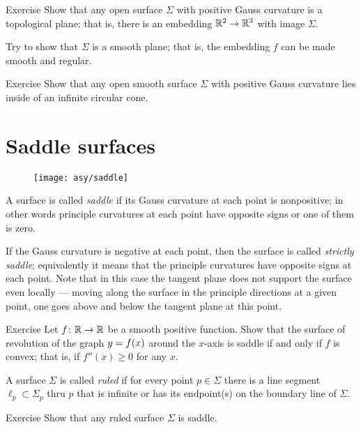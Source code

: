 \begin{thm}{Exercise}
Show that any open surface $\Sigma$ with positive Gauss curvature is a topological plane;
that is, there is an embedding $\mathbb{R}^2\to\mathbb{R}^3$ with image $\Sigma$.

Try to show that $\Sigma$ is a smooth plane; that is, the embedding $f$ can be made smooth and regular.
\end{thm}

\begin{thm}{Exercise}\label{ex:circular-cone}
Show that any open smooth surface $\Sigma$ with positive Gauss curvature
lies inside of an infinite circular cone. 
\end{thm} 


\section*{Saddle surfaces}

\begin{wrapfigure}{r}{43 mm}
\vskip-8mm
\centering
\texttt{[image: asy/saddle]}
\vskip0mm
\end{wrapfigure}

A surface is called \emph{saddle} if its Gauss curvature at each point is nonpositive;
in other words principle curvatures at each point have opposite signs or one of them is zero.

If the Gauss curvature is negative at each point,
then the surface is called \emph{strictly saddle};
equivalently it means that the principle curvatures have opposite signs at each point.
Note that in this case the tangent plane does not support the surface even locally --- moving along the surface in the principle directions at a given point, one goes above and below the tangent plane at this point.  


\begin{thm}{Exercise}\label{ex:convex-revolution}
Let $f\colon\mathbb{R}\to\mathbb{R}$ be a smooth positive function.
Show that the surface of revolution of the graph $y\z=f(x)$ around the $x$-axis
 is saddle if and only if $f$ is convex; that is, if $f''(x)\ge0$ for any $x$.
\end{thm}

A surface $\Sigma$ is called \emph{ruled} if for every point $p\in \Sigma$ there is a line segment $\ell_p\subset \Sigma_p$ thru $p$ that is infinite or has its endpoint(s) on the boundary line of $\Sigma$.

\begin{thm}{Exercise}\label{ex:ruled=>saddle}
Show that any ruled surface $\Sigma$ is saddle.
\end{thm}

